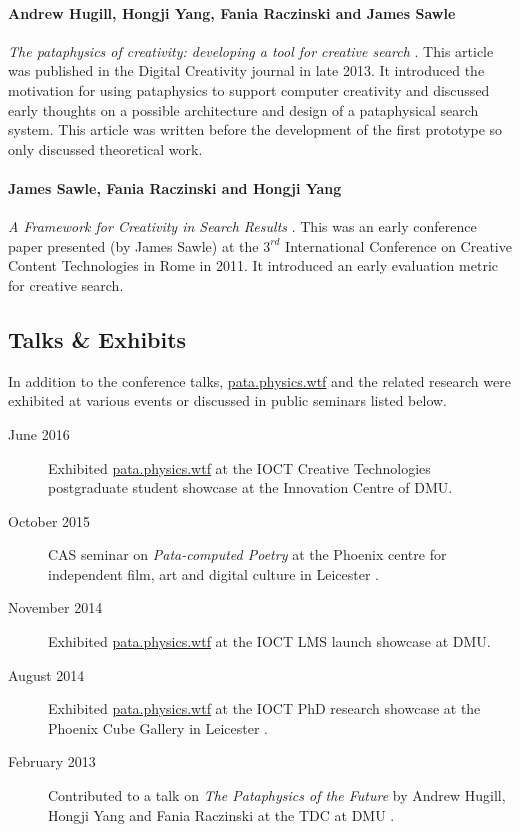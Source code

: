 \paragraph{Andrew Hugill, Hongji Yang, Fania Raczinski and James Sawle} \textit{The pataphysics of creativity: developing a tool for creative search} \autocite*{Hugill2013d}. This article was published in the Digital Creativity journal in late 2013. It introduced the motivation for using pataphysics to support computer creativity and discussed early thoughts on a possible architecture and design of a pataphysical search system. This article was written before the development of the first prototype so only discussed theoretical work.

\paragraph{James Sawle, Fania Raczinski and Hongji Yang} \textit{A Framework for Creativity in Search Results} \autocite*{Sawle2011}. This was an early conference paper presented (by James Sawle) at the $3^{rd}$ International Conference on Creative Content Technologies in Rome in 2011. It introduced an early evaluation metric for creative search.


\subsection{Talks \& Exhibits}
\label{s:talks}

In addition to the conference talks, \url{pata.physics.wtf} and the related research were exhibited at various events or discussed in public seminars listed below.

\begin{description}
  \item[June 2016] Exhibited \url{pata.physics.wtf} at the \ac{IOCT} Creative Technologies postgraduate student showcase at the Innovation Centre of \ac{DMU}.
  \item[October 2015] \ac{CAS} seminar on \textit{Pata-computed Poetry} at the Phoenix centre for independent film, art and digital culture in Leicester \autocite{Clark2015,Clark2015a}.
  \item[November 2014] Exhibited \url{pata.physics.wtf} at the \ac{IOCT} \ac{LMS} launch showcase at \ac{DMU}.
  \item[August 2014] Exhibited \url{pata.physics.wtf} at the \ac{IOCT} PhD research showcase at the Phoenix Cube Gallery in Leicester \autocite{Clark2014}.
  \item[February 2013] Contributed to a talk on \textit{The Pataphysics of the Future} by Andrew Hugill, Hongji Yang and Fania Raczinski at the \ac{TDC} at \ac{DMU} \autocite{Trans2013}.
\end{description}


